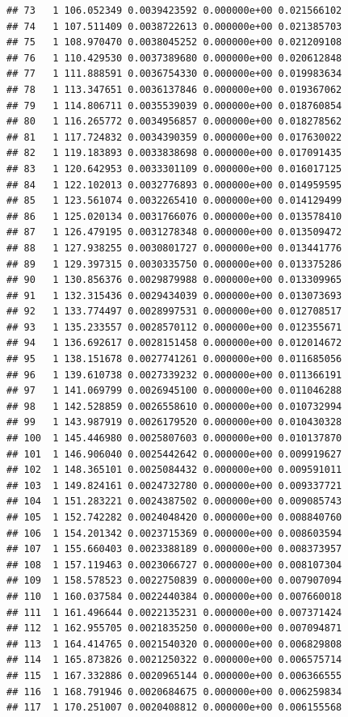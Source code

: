 \documentclass[article]{jss}\usepackage[]{graphicx}\usepackage[]{xcolor}
\makeatletter
\newenvironment{kframe}{%
 \def\at@end@of@kframe{}%
 \ifinner\ifhmode%
  \def\at@end@of@kframe{\end{minipage}}%
  \begin{minipage}{\columnwidth}%
 \fi\fi%
 \def\FrameCommand##1{\hskip\@totalleftmargin \hskip-\fboxsep
 \colorbox{shadecolor}{##1}\hskip-\fboxsep
     \hskip-\linewidth \hskip-\@totalleftmargin \hskip\columnwidth}%
 \MakeFramed {\advance\hsize-\width
   \@totalleftmargin\z@ \linewidth\hsize
   \@setminipage}}%
 {\par\unskip\endMakeFramed%
 \at@end@of@kframe}
\newenvironment{knitrout}{}{} %
\makeatother
\begin{document}
\begin{knitrout}
\begin{kframe}
\begin{verbatim}
## 73   1 106.052349 0.0039423592 0.000000e+00 0.021566102
## 74   1 107.511409 0.0038722613 0.000000e+00 0.021385703
## 75   1 108.970470 0.0038045252 0.000000e+00 0.021209108
## 76   1 110.429530 0.0037389680 0.000000e+00 0.020612848
## 77   1 111.888591 0.0036754330 0.000000e+00 0.019983634
## 78   1 113.347651 0.0036137846 0.000000e+00 0.019367062
## 79   1 114.806711 0.0035539039 0.000000e+00 0.018760854
## 80   1 116.265772 0.0034956857 0.000000e+00 0.018278562
## 81   1 117.724832 0.0034390359 0.000000e+00 0.017630022
## 82   1 119.183893 0.0033838698 0.000000e+00 0.017091435
## 83   1 120.642953 0.0033301109 0.000000e+00 0.016017125
## 84   1 122.102013 0.0032776893 0.000000e+00 0.014959595
## 85   1 123.561074 0.0032265410 0.000000e+00 0.014129499
## 86   1 125.020134 0.0031766076 0.000000e+00 0.013578410
## 87   1 126.479195 0.0031278348 0.000000e+00 0.013509472
## 88   1 127.938255 0.0030801727 0.000000e+00 0.013441776
## 89   1 129.397315 0.0030335750 0.000000e+00 0.013375286
## 90   1 130.856376 0.0029879988 0.000000e+00 0.013309965
## 91   1 132.315436 0.0029434039 0.000000e+00 0.013073693
## 92   1 133.774497 0.0028997531 0.000000e+00 0.012708517
## 93   1 135.233557 0.0028570112 0.000000e+00 0.012355671
## 94   1 136.692617 0.0028151458 0.000000e+00 0.012014672
## 95   1 138.151678 0.0027741261 0.000000e+00 0.011685056
## 96   1 139.610738 0.0027339232 0.000000e+00 0.011366191
## 97   1 141.069799 0.0026945100 0.000000e+00 0.011046288
## 98   1 142.528859 0.0026558610 0.000000e+00 0.010732994
## 99   1 143.987919 0.0026179520 0.000000e+00 0.010430328
## 100  1 145.446980 0.0025807603 0.000000e+00 0.010137870
## 101  1 146.906040 0.0025442642 0.000000e+00 0.009919627
## 102  1 148.365101 0.0025084432 0.000000e+00 0.009591011
## 103  1 149.824161 0.0024732780 0.000000e+00 0.009337721
## 104  1 151.283221 0.0024387502 0.000000e+00 0.009085743
## 105  1 152.742282 0.0024048420 0.000000e+00 0.008840760
## 106  1 154.201342 0.0023715369 0.000000e+00 0.008603594
## 107  1 155.660403 0.0023388189 0.000000e+00 0.008373957
## 108  1 157.119463 0.0023066727 0.000000e+00 0.008107304
## 109  1 158.578523 0.0022750839 0.000000e+00 0.007907094
## 110  1 160.037584 0.0022440384 0.000000e+00 0.007660018
## 111  1 161.496644 0.0022135231 0.000000e+00 0.007371424
## 112  1 162.955705 0.0021835250 0.000000e+00 0.007094871
## 113  1 164.414765 0.0021540320 0.000000e+00 0.006829808
## 114  1 165.873826 0.0021250322 0.000000e+00 0.006575714
## 115  1 167.332886 0.0020965144 0.000000e+00 0.006366555
## 116  1 168.791946 0.0020684675 0.000000e+00 0.006259834
## 117  1 170.251007 0.0020408812 0.000000e+00 0.006155568

\end{verbatim}
\end{kframe}
\end{knitrout}
\end{document}
